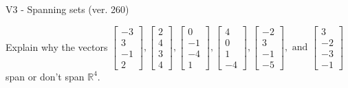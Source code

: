\begin{exercise}
  \begin{exerciseTitle}V3 - Spanning sets (ver. 260)\end{exerciseTitle}
  \begin{exerciseStatement}
    Explain why the vectors \(\left[\begin{array}{r}
-3 \\
3 \\
-1 \\
2
\end{array}\right] , \left[\begin{array}{r}
2 \\
4 \\
3 \\
4
\end{array}\right] , \left[\begin{array}{r}
0 \\
-1 \\
-4 \\
1
\end{array}\right] , \left[\begin{array}{r}
4 \\
0 \\
1 \\
-4
\end{array}\right] , \left[\begin{array}{r}
-2 \\
3 \\
-1 \\
-5
\end{array}\right] , \text{ and } \left[\begin{array}{r}
3 \\
-2 \\
-3 \\
-1
\end{array}\right]\) span or don't span \(\mathbb{R}^4\). 
	



\end{exerciseStatement}
\end{exercise}
